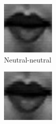 \begin{figure}[H]
\begin{subfigure}[b]{0.15\textwidth}
		\includegraphics[width=\textwidth]{./img/timeseriesHappy/S026_006_00000002_conew1.png}
		\caption{Neutral-neutral}
		\label{fig:timeseriesHappy:b}
	\end{subfigure}
	\begin{subfigure}[b]{0.15\textwidth}
		\includegraphics[width=\textwidth]{./img/timeseriesHappy/S026_006_00000003_conew1.png}

\end{subfigure}
\end{figure}
